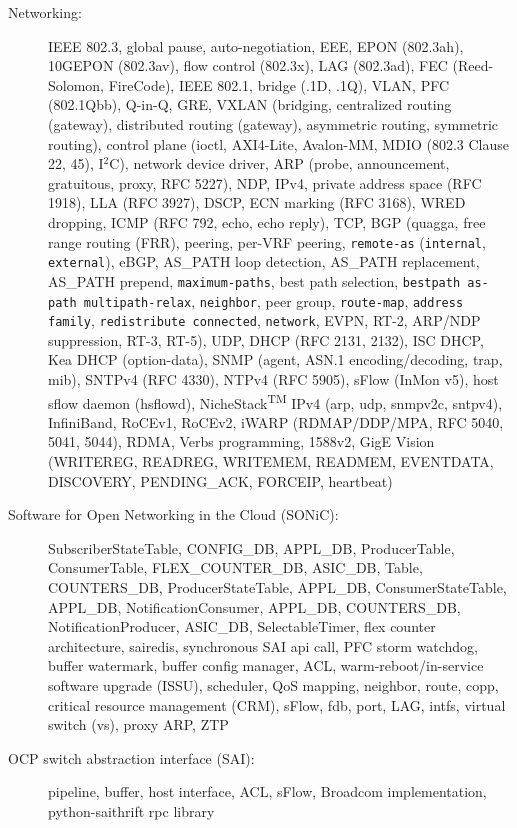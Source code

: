 \documentclass[letterpaper,11pt]{article}
\begin{document}
\begin{description}
\item[Networking:] IEEE 802.3, global pause, auto-negotiation, EEE, EPON (802.3ah), 10GEPON (802.3av), flow control (802.3x), LAG (802.3ad),
FEC (Reed-Solomon, FireCode),
IEEE 802.1, bridge (.1D, .1Q), VLAN, PFC (802.1Qbb), Q-in-Q, GRE, VXLAN (bridging, centralized routing (gateway),
distributed routing (gateway), asymmetric routing, symmetric routing),
control plane (ioctl, AXI4-Lite, Avalon-MM, MDIO (802.3 Clause 22, 45), I$^2$C),
network device driver, ARP (probe, announcement, gratuitous, proxy, RFC 5227), NDP, IPv4, private address space (RFC 1918), LLA (RFC 3927),
DSCP, ECN marking (RFC 3168), WRED dropping,
ICMP (RFC 792, echo, echo reply),
TCP, BGP (quagga, free range routing (FRR), peering, per-VRF peering, {\tt remote-as} ({\tt internal}, {\tt external}), eBGP,
AS\_PATH loop detection, AS\_PATH replacement, AS\_PATH prepend,
{\tt maximum-paths}, best path selection,
{\tt bestpath as-path multipath-relax}, {\tt neighbor}, peer group, {\tt route-map},
{\tt address family},
{\tt redistribute connected}, {\tt network}, EVPN, RT-2, ARP/NDP suppression, RT-3, RT-5),
UDP, DHCP (RFC 2131, 2132), ISC DHCP, Kea DHCP (option-data), SNMP (agent, ASN.1 encoding/decoding, trap, mib), SNTPv4 (RFC 4330), NTPv4 (RFC 5905),
sFlow (InMon v5), host sflow daemon (hsflowd),
%
NicheStack\textsuperscript{TM} IPv4 (arp, udp, snmpv2c, sntpv4),
%
InfiniBand, RoCEv1, RoCEv2,
iWARP (RDMAP/DDP/MPA, RFC 5040, 5041, 5044), RDMA, Verbs programming,
%
1588v2,
GigE Vision (WRITEREG, READREG, WRITEMEM, READMEM, EVENTDATA, DISCOVERY, PENDING\_ACK, FORCEIP, heartbeat)

\item[Software for Open Networking in the Cloud (SONiC):] SubscriberStateTable, CONFIG\_DB, APPL\_DB,
ProducerTable, ConsumerTable, FLEX\_COUNTER\_DB, ASIC\_DB,
Table, COUNTERS\_DB,
ProducerStateTable, APPL\_DB, ConsumerStateTable, APPL\_DB,
%
NotificationConsumer, APPL\_DB, COUNTERS\_DB, NotificationProducer, ASIC\_DB,
SelectableTimer,
flex counter architecture, sairedis, synchronous SAI api call, PFC storm watchdog,
buffer watermark, buffer config manager, ACL, warm-reboot/in-service software upgrade (ISSU), scheduler, QoS mapping,
neighbor, route, copp, critical resource management (CRM), sFlow, fdb, port, LAG, intfs,
virtual switch (vs), proxy ARP, ZTP

\item[OCP switch abstraction interface (SAI):] pipeline, buffer, host interface, ACL, sFlow,
Broadcom implementation, python-saithrift rpc library


\end{description}
\end{document}
